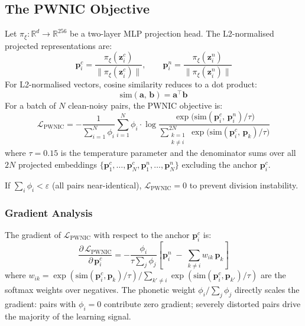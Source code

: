 \documentclass[12pt,a4paper]{report}
\newcommand{\R}{\mathbb{R}}
\newcommand{\PWNIC}{\mathcal{L}_{\mathrm{PWNIC}}}
\newcommand{\simfn}{\mathrm{sim}}
\begin{document}
\subsection{The PWNIC Objective}

Let $\pi_\xi : \R^d \to \R^{256}$ be a two-layer MLP projection head. The L2-normalised projected representations are:
\begin{equation}
  \mathbf{p}_i^c = \frac{\pi_\xi(\mathbf{z}_i^c)}{\|\pi_\xi(\mathbf{z}_i^c)\|}, \qquad
  \mathbf{p}_i^n = \frac{\pi_\xi(\mathbf{z}_i^n)}{\|\pi_\xi(\mathbf{z}_i^n)\|}
  \label{eq:projection}
\end{equation}
For L2-normalised vectors, cosine similarity reduces to a dot product:
\begin{equation}
  \simfn(\mathbf{a},\,\mathbf{b}) = \mathbf{a}^\top \mathbf{b}
  \label{eq:cosine}
\end{equation}
For a batch of $N$ clean-noisy pairs, the PWNIC objective is:
\begin{equation}
  \boxed{
  \PWNIC = -\frac{1}{\displaystyle\sum_{i=1}^{N}\phi_i}
  \sum_{i=1}^{N} \phi_i \cdot
  \log \frac{\exp\!\bigl(\simfn(\mathbf{p}_i^c,\,\mathbf{p}_i^n)/\tau\bigr)}
            {\displaystyle\sum_{\substack{k=1\\k\neq i}}^{2N}
             \exp\!\bigl(\simfn(\mathbf{p}_i^c,\,\mathbf{p}_k)/\tau\bigr)}
  }
  \label{eq:pwnic}
\end{equation}
where $\tau = 0.15$ is the temperature parameter and the denominator sums over all $2N$ projected embeddings $\{\mathbf{p}_1^c, \ldots, \mathbf{p}_N^c, \mathbf{p}_1^n, \ldots, \mathbf{p}_N^n\}$ excluding the anchor $\mathbf{p}_i^c$.

If $\sum_i \phi_i < \varepsilon$ (all pairs near-identical), $\PWNIC = 0$ to prevent division instability.

\subsubsection{Gradient Analysis}
The gradient of $\PWNIC$ with respect to the anchor $\mathbf{p}_i^c$ is:
\begin{equation}
  \frac{\partial\, \PWNIC}{\partial\, \mathbf{p}_i^c}
  = -\frac{\phi_i}{\tau \sum_j \phi_j}
  \left[\mathbf{p}_i^n \;-\; \sum_{k \neq i} w_{ik}\,\mathbf{p}_k\right]
  \label{eq:pwnic_gradient}
\end{equation}
where $w_{ik} = \exp(\simfn(\mathbf{p}_i^c, \mathbf{p}_k)/\tau) / \sum_{k'\neq i}\exp(\simfn(\mathbf{p}_i^c, \mathbf{p}_{k'})/\tau)$ are the softmax weights over negatives. The phonetic weight $\phi_i / \sum_j \phi_j$ directly scales the gradient: pairs with $\phi_i = 0$ contribute zero gradient; severely distorted pairs drive the majority of the learning signal.
\end{document}
